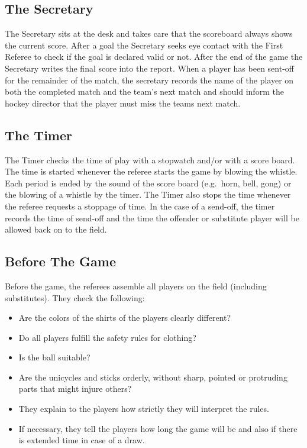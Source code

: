 \subsection{The Secretary}
The Secretary sits at the desk and takes care that the scoreboard always shows the current score.
After a goal the Secretary seeks eye contact with the First Referee to check if the goal is declared valid or not.
After the end of the game the Secretary writes the final score into the report.
When a player has been sent-off for the remainder of the match, the secretary records the name of the player on both the completed match and the team’s next match and should inform the hockey director that the player must miss the teams next match.

\subsection{The Timer}
The Timer checks the time of play with a stopwatch and/or with a score board.
The time is started whenever the referee starts the game by blowing the whistle.
Each period is ended by the sound of the score board (e.g.\ horn, bell, gong) or the blowing of a whistle by the timer.
The Timer also stops the time whenever the referee requests a stoppage of time.
In the case of a send-off, the timer records the time of send-off and the time the offender or substitute player will be allowed back on to the field.

\subsection{Before The Game}
Before the game, the referees assemble all players on the field (including substitutes).
They check the following:
\begin{itemize}
\item Are the colors of the shirts of the players clearly different?
\item Do all players fulfill the safety rules for clothing?
\item Is the ball suitable?
\item Are the unicycles and sticks orderly, without sharp, pointed or protruding parts that might injure others?
\item They explain to the players how strictly they will interpret the rules.
\item If necessary, they tell the players how long the game will be and also if there is extended time in case of a draw.
\end{itemize}

